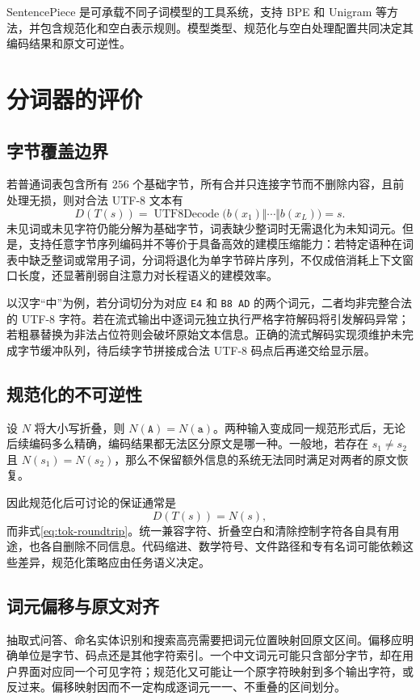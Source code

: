 \documentclass[../textbook.tex]{subfiles}
\begin{document}
SentencePiece 是可承载不同子词模型的工具系统，支持 BPE 和 Unigram 等方法，并包含规范化和空白表示规则\cite{googleSentencePiece}。模型类型、规范化与空白处理配置共同决定其编码结果和原文可逆性。

\section{分词器的评价}

\subsection{字节覆盖边界}
若普通词表包含所有 $256$ 个基础字节，所有合并只连接字节而不删除内容，且前处理无损，则对合法 UTF-8 文本有
\begin{equation}\label{eq:tok-roundtrip}
 D(T(s))=\operatorname{UTF8Decode}
 \bigl(b(x_1)\Vert\cdots\Vert b(x_L)\bigr)=s.
\end{equation}
未见词或未见字符仍能分解为基础字节，词表缺少整词时无需退化为未知词元。但是，支持任意字节序列编码并不等价于具备高效的建模压缩能力：若特定语种在词表中缺乏整词或常用子词，分词将退化为单字节碎片序列，不仅成倍消耗上下文窗口长度，还显著削弱自注意力对长程语义的建模效率。

以汉字“中”为例，若分词切分为对应 \texttt{E4} 和 \texttt{B8 AD} 的两个词元，二者均非完整合法的 UTF-8 字符。若在流式输出中逐词元独立执行严格字符解码将引发解码异常；若粗暴替换为非法占位符则会破坏原始文本信息。正确的流式解码实现须维护未完成字节缓冲队列，待后续字节拼接成合法 UTF-8 码点后再递交给显示层。

\subsection{规范化的不可逆性}
设 $N$ 将大小写折叠，则 $N(\texttt{A})=N(\texttt{a})$。两种输入变成同一规范形式后，无论后续编码多么精确，编码结果都无法区分原文是哪一种。一般地，若存在 $s_1\ne s_2$ 且 $N(s_1)=N(s_2)$，那么不保留额外信息的系统无法同时满足对两者的原文恢复。

因此规范化后可讨论的保证通常是
\begin{equation}
 D(T(s))=N(s),
\end{equation}
而非式\eqref{eq:tok-roundtrip}。统一兼容字符、折叠空白和清除控制字符各自具有用途，也各自删除不同信息。代码缩进、数学符号、文件路径和专有名词可能依赖这些差异，规范化策略应由任务语义决定。

\subsection{词元偏移与原文对齐}
抽取式问答、命名实体识别和搜索高亮需要把词元位置映射回原文区间。偏移应明确单位是字节、码点还是其他字符索引。一个中文词元可能只含部分字节，却在用户界面对应同一个可见字符；规范化又可能让一个原字符映射到多个输出字符，或反过来。偏移映射因而不一定构成逐词元一一、不重叠的区间划分。
\end{document}
